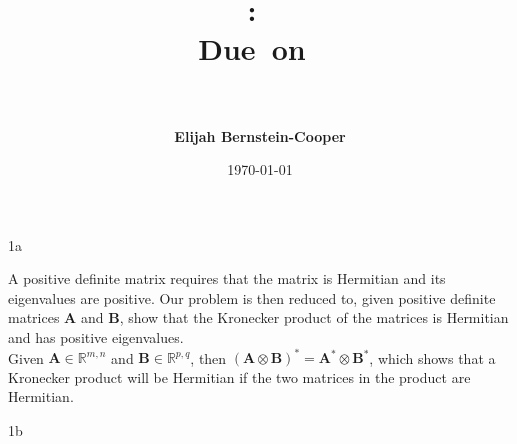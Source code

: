 \documentclass{article}
\title{\vspace{0in}
    \textmd{\textbf{\hmwkClass:\ \hmwkTitle}}\\
    \normalsize\vspace{0.1in}\small{Due\ on\ \hmwkDueDate}\\
    \vspace{0.1in}\large{\textit{\hmwkClassInstructor\ \hmwkClassTime}}
    \vspace{0.5in}}
\author{\textbf{Elijah Bernstein-Cooper}}
\date{\today} %
\begin{document}
\maketitle

\begin{homeworkProblem}

    \begin{homeworkSection}{1a}

        A positive definite matrix requires that the matrix is Hermitian and
        its eigenvalues are positive. Our problem is then reduced to, given
        positive definite matrices $\bm{A}$ and $\bm{B}$, show that the
        Kronecker product of the matrices is Hermitian and has positive
        eigenvalues.\\

        Given $\bm{A} \in \mathbb{R}^{m,n}$ and $\bm{B} \in \mathbb{R}^{p,q}$,
        then $(\bm{A} \otimes \bm{B})^* = \bm{A}^* \otimes \bm{B}^*$, which
        shows that a Kronecker product will be Hermitian if the two matrices in
        the product are Hermitian.\\



    \end{homeworkSection}

    \begin{homeworkSection}{1b}
       

    \end{homeworkSection}

\end{homeworkProblem}
\end{document}
